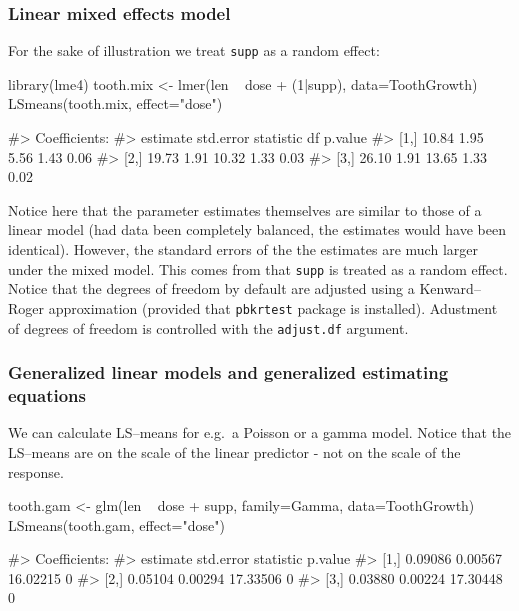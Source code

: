 \hypertarget{linear-mixed-effects-model}{%
\subsubsection{Linear mixed effects
model}\label{linear-mixed-effects-model}}

For the sake of illustration we treat \verb|supp| as a random effect:

\begin{Schunk}
\begin{Sinput}
library(lme4)
tooth.mix <- lmer(len ~ dose + (1|supp), data=ToothGrowth)
LSmeans(tooth.mix, effect="dose")
\end{Sinput}
\begin{Soutput}
#> Coefficients:
#>      estimate std.error statistic    df p.value
#> [1,]    10.84      1.95      5.56  1.43    0.06
#> [2,]    19.73      1.91     10.32  1.33    0.03
#> [3,]    26.10      1.91     13.65  1.33    0.02
\end{Soutput}
\end{Schunk}

Notice here that the parameter estimates themselves are similar to those
of a linear model (had data been completely balanced, the estimates
would have been identical). However, the standard errors of the the
estimates are much larger under the mixed model. This comes from that
\texttt{supp} is treated as a random effect. Notice that the degrees of
freedom by default are adjusted using a Kenward--Roger approximation
(provided that \texttt{pbkrtest} package \citep{pbkrtest} is installed).
Adustment of degrees of freedom is controlled with the
\texttt{adjust.df} argument.

\hypertarget{generalized-linear-models-and-generalized-estimating-equations}{%
\subsubsection{Generalized linear models and generalized estimating
equations}\label{generalized-linear-models-and-generalized-estimating-equations}}

We can calculate LS--means for e.g.~a Poisson or a gamma model. Notice
that the LS--means are on the scale of the linear predictor - not on the
scale of the response.

\begin{Schunk}
\begin{Sinput}
tooth.gam <- glm(len ~ dose + supp, family=Gamma, data=ToothGrowth)
LSmeans(tooth.gam, effect="dose")
\end{Sinput}
\begin{Soutput}
#> Coefficients:
#>      estimate std.error statistic p.value
#> [1,]  0.09086   0.00567  16.02215       0
#> [2,]  0.05104   0.00294  17.33506       0
#> [3,]  0.03880   0.00224  17.30448       0
\end{Soutput}
\end{Schunk}

